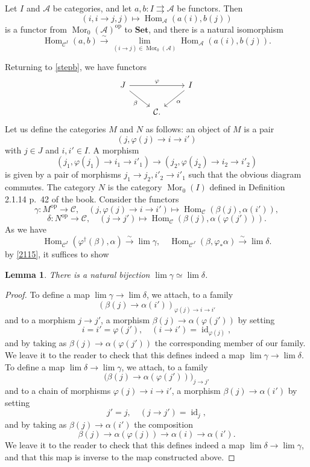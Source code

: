 \documentclass[12pt]{article}
\newtheorem{lem}[thm]{Lemma}
\theoremstyle{remark}
\theoremstyle{definition}
\newcommand{\A}{\mathcal A}
\newcommand{\C}{\mathcal C}
\newcommand{\parar}{\rightrightarrows}\newcommand{\paralelarrows}{\rightrightarrows}%
\newcommand{\Set}{\mathbf{Set}}
\newcommand{\xr}{\xrightarrow}
\DeclareMathOperator{\id}{id}
\DeclareMathOperator{\Hom}{Hom}%
\DeclareMathOperator{\Mor}{Mor}
\DeclareMathOperator{\op}{op}
\begin{document}
Let $I$ and $\A$ be categories, and let $a,b:I\parar\A$ be functors. Then 
$$
(i,i\to j,j)\mapsto\Hom_\A(a(i),b(j))
$$ 
is a functor from $\Mor_0(\A)^{\op}$ to $\Set$, and there is a natural isomorphism 
%
\begin{equation}\label{2115} 
\Hom_{\C^I}(a,b)\xr\sim\lim_{(i\to j)\in\Mor_0(\A)}\Hom_\A(a(i),b(j)).
\end{equation}
%

Returning to \eqref{stepb}, we have functors 
$$
\begin{tikzcd}
J\ar{rr}{\varphi}\ar{dr}[swap]{\beta}&&I\ar{dl}{\alpha}\\ 
&\C.
\end{tikzcd}
$$ 
Let us define the categories $M$ and $N$ as follows: an object of $M$ is a pair 
$$
(j,\varphi(j)\to i\to i')
$$ 
with $j\in J$ and $i,i'\in I$. A morphism 
$$
(j_1,\varphi(j_1)\to i_1\to i'_1)\to(j_2,\varphi(j_2)\to i_2\to i'_2)
$$ 
is given by a pair of morphisms $j_1\to j_2,i'_2\to i'_1$ such that the obvious diagram commutes. The category $N$ is the category $\Mor_0(I)$ defined in Definition 2.1.14 p.~42 of the book. Consider the functors 
$$
\gamma:M^{\op}\to\C,\quad(j,\varphi(j)\to i\to i')\mapsto\Hom_\C(\beta(j),\alpha(i')), 
$$ 
$$
\delta:N^{\op}\to\C,\quad(j\to j')\mapsto\Hom_\C(\beta(j),\alpha(\varphi(j'))). 
$$ 
As we have 
$$
\Hom_{\C^I}(\varphi^\dagger(\beta),\alpha)\xr\sim\lim\gamma,\quad
\Hom_{\C^J}(\beta,\varphi_*\alpha)\xr\sim\lim\delta. 
$$ 
by \eqref{2115}, it suffices to show 
%
\begin{lem} 
%
There is a natural bijection $\lim\gamma\simeq\lim\delta$. 
%
\end{lem} 
%
\begin{proof}
To define a map $\lim\gamma\to\lim\delta$, we attach, to a family 
$$
(\beta(j)\to\alpha(i'))_{\varphi(j)\to i\to i'}
$$ 
and to a morphism $j\to j'$, a morphism $\beta(j)\to\alpha(\varphi(j'))$ by setting 
$$
i=i'=\varphi(j'),\quad(i\to i')=\id_{\varphi(j)},
$$ 
and by taking as $\beta(j)\to\alpha(\varphi(j'))$ the corresponding member of our family. We leave it to the reader to check that this defines indeed a map $\lim\gamma\to\lim\delta$. To define a map $\lim\delta\to\lim\gamma$, we attach, to a family 
$$
\big(\beta(j)\to\alpha(\varphi(j'))\big)_{j\to j'}
$$ 
and to a chain of morphisms $\varphi(j)\to i\to i'$, a morphism $\beta(j)\to\alpha(i')$ by setting 
$$
j'=j,\quad(j\to j')=\id_{j},
$$ 
and by taking as $\beta(j)\to\alpha(i')$ the composition 
$$
\beta(j)\to\alpha(\varphi(j))\to\alpha(i)\to\alpha(i'). 
$$ 
We leave it to the reader to check that this defines indeed a map $\lim\delta\to\lim\gamma$, and that this map is inverse to the map constructed above.
\end{proof}
%
\end{document}
